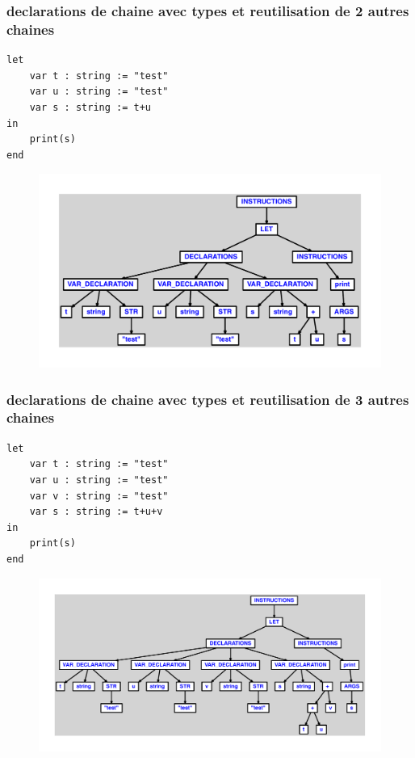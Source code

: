 \documentclass{article}
\begin{document}
\subsubsection{declarations de chaine avec types et reutilisation de 2 autres chaines}
\begin{lstlisting}
let
	var t : string := "test"
	var u : string := "test"
	var s : string := t+u
in
	print(s)
end
\end{lstlisting}
\newpage
\begin{figure}[H]
\centering
\includegraphics[max width=\textwidth]{ast/ast_313.pdf}
\end{figure}
\newpage
\subsubsection{declarations de chaine avec types et reutilisation de 3 autres chaines}
\begin{lstlisting}
let
	var t : string := "test"
	var u : string := "test"
	var v : string := "test"
	var s : string := t+u+v
in
	print(s)
end
\end{lstlisting}
\newpage
\begin{figure}[H]
\centering
\includegraphics[max width=\textwidth]{ast/ast_314.pdf}
\end{figure}
\newpage
\end{document}
